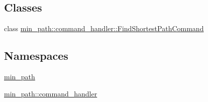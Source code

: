 \subsection*{Classes}
\begin{DoxyCompactItemize}
\item 
class \hyperlink{a00005}{min\+\_\+path\+::command\+\_\+handler\+::\+Find\+Shortest\+Path\+Command}
\end{DoxyCompactItemize}
\subsection*{Namespaces}
\begin{DoxyCompactItemize}
\item 
 \hyperlink{a00033}{min\+\_\+path}
\item 
 \hyperlink{a00035}{min\+\_\+path\+::command\+\_\+handler}
\end{DoxyCompactItemize}
